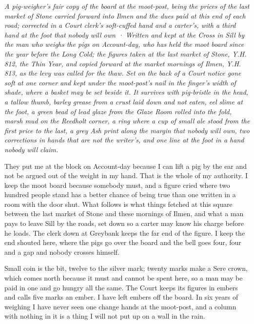 \documentclass{design/chronicle}
\begin{document}
\clearpage{}
{\centering\FellFont\itshape\footnotesize\color{faded} A pig-weigher’s fair copy of the board at the moot-post, being the prices of the last market of Stone carried forward into Ilmen and the dues paid at this end of each road; corrected in a Court clerk’s soft-cuffed hand and a carter’s, with a third hand at the foot that nobody will own · Written and kept at the Cross in Sill by the man who weighs the pigs on Account-day, who has held the moot board since the year before the Long Cold; the figures taken at the last market of Stone, Y.H. 812, the Thin Year, and copied forward at the market mornings of Ilmen, Y.H. 813, as the levy was called for the thaw. Set on the back of a Court notice gone soft at one corner and kept under the moot-post’s nail in the finger’s width of shade, where a basket may be set beside it. It survives with pig-bristle in the head, a tallow thumb, barley grease from a crust laid down and not eaten, eel slime at the foot, a green bead of lead glaze from the Glaze Room rolled into the fold, marsh mud on the Reedholt corner, a ring where a cup of small ale stood from the first price to the last, a grey Ash print along the margin that nobody will own, two corrections in hands that are not the writer’s, and one line at the foot in a hand nobody will claim.\par}\medskip
They put me at the block on Account-day because I can lift a pig by the ear and not be argued out of the weight in my hand. That is the whole of my authority. I keep the moot board because somebody must, and a figure cried where two hundred people stand has a better chance of being true than one written in a room with the door shut. What follows is what things fetched at this square between the last market of Stone and these mornings of Ilmen, and what a man pays to leave Sill by the roads, set down so a carter may know his charge before he loads. The clerk down at Greybank keeps the far end of the figure. I keep the end shouted here, where the pigs go over the board and the bell goes four, four and a gap and nobody crosses himself.

Small coin is the bit, twelve to the silver mark; twenty marks make a Sere crown, which comes north because it must and cannot be spent here, so a man may be paid in one and go hungry all the same. The Court keeps its figures in embers and calls five marks an ember. I have left embers off the board. In six years of weighing I have never seen one change hands at the moot-post, and a column with nothing in it is a thing I will not put up on a wall in the rain.
\end{document}
